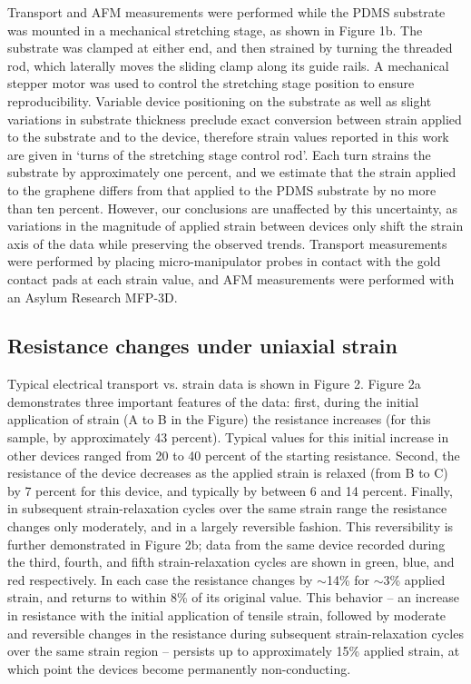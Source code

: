 \documentclass[edeposit,fullpage,draftthesis]{uiucthesis2009}
\begin{document}
    Transport and AFM measurements were performed while the PDMS substrate was mounted in a mechanical stretching stage, as shown in Figure 1b. The substrate was clamped at either end, and then strained by turning the threaded rod, which laterally moves the sliding clamp along its guide rails. A mechanical stepper motor was used to control the stretching stage position to ensure reproducibility. Variable device positioning on the substrate as well as slight variations in substrate thickness preclude exact conversion between strain applied to the substrate and to the device, therefore strain values reported in this work are given in `turns of the stretching stage control rod'. Each turn strains the substrate by approximately one percent, and we estimate that the strain applied to the graphene differs from that applied to the PDMS substrate by no more than ten percent. However, our conclusions are unaffected by this uncertainty, as variations in the magnitude of applied strain between devices only shift the strain axis of the data while preserving the observed trends. Transport measurements were performed by placing micro-manipulator probes in contact with the gold contact pads at each strain value, and AFM measurements were performed with an Asylum Research MFP-3D.
    
    \subsection{Resistance changes under uniaxial strain}
    
    Typical electrical transport vs. strain data is shown in Figure 2. Figure 2a demonstrates three important features of the data: first, during the initial application of strain (A to B in the Figure) the resistance increases (for this sample, by approximately 43 percent). Typical values for this initial increase in other devices ranged from 20 to 40 percent of the starting resistance. Second, the resistance of the device decreases as the applied strain is relaxed (from B to C) by 7 percent for this device, and typically by between 6 and 14 percent. Finally, in subsequent strain-relaxation cycles over the same strain range the resistance changes only moderately, and in a largely reversible fashion. This reversibility is further demonstrated in Figure 2b; data from the same device recorded during the third, fourth, and fifth strain-relaxation cycles are shown in green, blue, and red respectively. In each case the resistance changes by $\sim$14\% for $\sim$3\% applied strain, and returns to within 8\% of its original value. This behavior -- an increase in resistance with the initial application of tensile strain, followed by moderate and reversible changes in the resistance during subsequent strain-relaxation cycles over the same strain region -- persists up to approximately 15\% applied strain, at which point the devices become permanently non-conducting.
\end{document}
